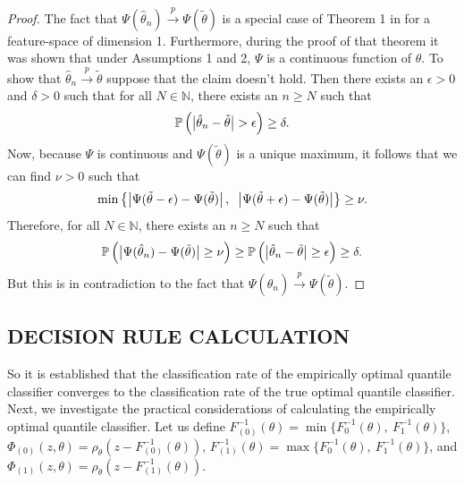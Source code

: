 \begin{proof}
  The fact that
  $\Psi(\hat{\theta}_n) \stackrel{p}{\longrightarrow} \Psi(\tilde{\theta})$ is a
  special case of Theorem 1 in \cite{hennig2016} for a feature-space of
  dimension 1.  Furthermore, during the proof of that theorem it was shown that
  under Assumptions 1 and 2, $\Psi$ is a continuous function of $\theta$.  To
  show that $\hat{\theta}_n \stackrel{p}{\longrightarrow} \tilde{\theta}$
  suppose that the claim doesn't hold.  Then there exists an $\epsilon > 0$ and
  $\delta > 0$ such that for all $N \in \mathbb{N}$, there exists an $n \geq N$
  such that
  \begin{equation*}
    \mathbb{P}\,\Big(
    \big| \hat{\theta}_n - \tilde{\theta} \big|
    > \epsilon \Big)
    \geq \delta.
  \end{equation*}
  Now, because $\Psi$ is continuous and $\Psi(\tilde{\theta})$ is a unique
  maximum, it follows that we can find $\nu > 0$ such that
  \begin{equation*}
    \min \left\{
      \big| \Psi(\Tilde{\theta} - \epsilon) - \Psi(\tilde{\theta}) \big|\,,
      \hspace{2mm}
      \big| \Psi(\Tilde{\theta} + \epsilon) - \Psi(\tilde{\theta}) \big|
    \right\} \geq \nu.
  \end{equation*}
  Therefore, for all $N \in \mathbb{N}$, there exists an $n \geq N$ such that
  \begin{equation*}
    \mathbb{P}\,\Big(
    \big| \Psi(\hat{\theta}_n) - \Psi(\tilde{\theta}) \big|
    \geq \nu \Big) \geq
    \mathbb{P}\,\Big(
    \big| \hat{\theta}_n - \tilde{\theta} \big|
    \geq \epsilon \Big)
    \geq \delta.
  \end{equation*}
  But this is in contradiction to the fact that
  $\Psi(\hat{\theta}_n) \stackrel{p}{\longrightarrow} \Psi(\tilde{\theta})$.
\end{proof}




\subsection{DECISION RULE CALCULATION}
\label{sec:empirical-quantile-classifier-results}

So it is established that the classification rate of the empirically optimal
quantile classifier converges to the classification rate of the true optimal
quantile classifier.  Next, we investigate the practical considerations of
calculating the empirically optimal quantile classifier.  Let us define
$F_{(0)}^{-1}(\theta) = \min\Big\{ F_0^{-1}(\theta),~ F_1^{-1}(\theta) \Big\}$,
$\Phi_{(0)}(z, \theta) = \rho_{\theta}\left(z - F_{(0)}^{-1}(\theta)\right)$,
$F_{(1)}^{-1}(\theta) = \max\Big\{ F_0^{-1}(\theta),~ F_1^{-1}(\theta) \Big\}$,
and
$\Phi_{(1)}(z, \theta) = \rho_{\theta}\left(z - F_{(1)}^{-1}(\theta)\right)$.


